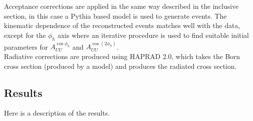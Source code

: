 Acceptance corrections are applied in the same way described in the inclusive section, in this case a Pythia based model is used to generate events.  The kinematic dependence of the reconstructed events matches well with the data, except for the $\phi_h$ axis where an iterative procedure is used to find suitable initial parameters for $A_{UU}^{\cos\phi_h}$ and $A_{UU}^{\cos(2\phi_h)}$.  \\

Radiative corrections are produced using HAPRAD 2.0, which takes the Born cross section (produced by a model) and produces the radiated cross section.  


\subsection{Results}
Here is a description of the results. 


